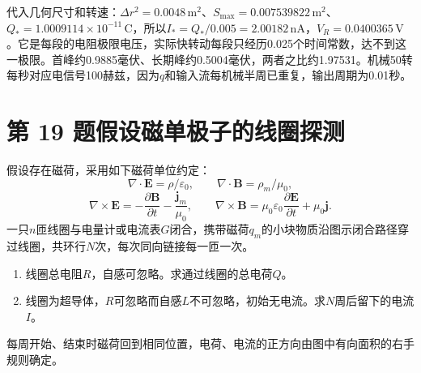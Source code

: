 \documentclass[UTF8,fontset=fandol,a4paper,11pt]{ctexart}
\newcommand{\vect}[1]{\bm{#1}}
\newcommand{\figcaption}[1]{\par\vspace{2pt}{\small\color{muted}#1}\par}
\begin{document}
代入几何尺寸和转速：$\Delta r^2=0.0048\,\mathrm{m^2}$、$S_{\max}=0.007539822\,\mathrm{m^2}$、$Q_*=1.0009114\times10^{-11}\,\mathrm C$，所以$I_*=Q_*/0.005=2.00182\,\mathrm{nA}$，$V_R=0.0400365\,\mathrm V$。它是每段的电阻极限电压，实际快转动每段只经历0.025个时间常数，达不到这一极限。首峰约0.9885毫伏、长期峰约0.5004毫伏，两者之比约1.97531。机械50转每秒对应电信号100赫兹，因为$q$和输入流每机械半周已重复，输出周期为0.01秒。




\section*{第 19 题\quad 假设磁单极子的线圈探测}\label{q:19}


假设存在磁荷，采用如下磁荷单位约定：
\[
 \nabla\cdot\vect E=\rho/\varepsilon_0,\qquad
 \nabla\cdot\vect B=\rho_m/\mu_0,
\]
\[
 \nabla\times\vect E=-\frac{\partial\vect B}{\partial t}
 -\frac{\vect j_m}{\mu_0},\qquad
 \nabla\times\vect B=\mu_0\varepsilon_0\frac{\partial\vect E}{\partial t}
 +\mu_0\vect j.
\]
一只$n$匝线圈与电量计或电流表$G$闭合，携带磁荷$q_m$的小块物质沿图示闭合路径穿过线圈，共环行$N$次，每次同向链接每一匝一次。
\begin{enumerate}
\item 线圈总电阻$R$，自感可忽略。求通过线圈的总电荷$Q$。
\item 线圈为超导体，$R$可忽略而自感$L$不可忽略，初始无电流。求$N$周后留下的电流$I$。
\end{enumerate}
每周开始、结束时磁荷回到相同位置，电荷、电流的正方向由图中有向面积的右手规则确定。

\begin{center}\begin{minipage}{.98\linewidth}\centering
{}
\figcaption{图电5.19\quad 闭合路径链接线圈；绕回部分位于线圈之外}
\end{minipage}\end{center}
\end{document}
